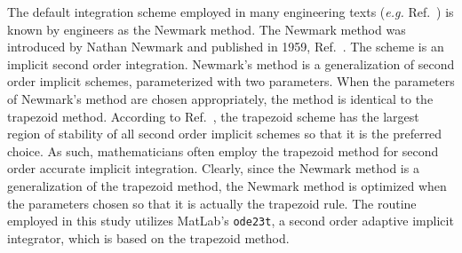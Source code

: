 The default integration scheme employed in many engineering texts (\emph{e.g.} Ref.~\cite{petyt1990introduction}) is known by engineers as the Newmark method. The Newmark method was introduced by Nathan Newmark and published in 1959, Ref.~\cite{newmark1959method}. The scheme is an implicit second order integration. Newmark's method is a generalization of second order implicit schemes, parameterized with two parameters. When the parameters of Newmark's method are chosen appropriately, the method is identical to the trapezoid method. According to Ref.~\cite{lambert1991numerical}, the trapezoid scheme has the largest region of stability of all second order implicit schemes so that it is the preferred choice. As such, mathematicians often employ the trapezoid method for second order accurate implicit integration. Clearly, since the Newmark method is a generalization of the trapezoid method, the Newmark method is optimized when the parameters chosen so that it is actually the trapezoid rule. The routine employed in this study utilizes MatLab's \texttt{ode23t}, a second order adaptive implicit integrator, which is based on the trapezoid method. 

